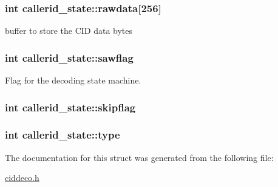 \subsubsection[{rawdata}]{\setlength{\rightskip}{0pt plus 5cm}int callerid\+\_\+state\+::rawdata\mbox{[}256\mbox{]}}\label{structcallerid__state_a6a073312c8b127292ccd43573f46af1f}


buffer to store the C\+I\+D data bytes 

\hypertarget{structcallerid__state_a62086559eee5b1f234fb1fc0e742d7c4}{}
\subsubsection[{sawflag}]{\setlength{\rightskip}{0pt plus 5cm}int callerid\+\_\+state\+::sawflag}\label{structcallerid__state_a62086559eee5b1f234fb1fc0e742d7c4}


Flag for the decoding state machine. 

\hypertarget{structcallerid__state_a84a4244e0f6780f44cb57ae15fa0dfe4}{}
\subsubsection[{skipflag}]{\setlength{\rightskip}{0pt plus 5cm}int callerid\+\_\+state\+::skipflag}\label{structcallerid__state_a84a4244e0f6780f44cb57ae15fa0dfe4}
\hypertarget{structcallerid__state_a40a4612d818438947b0d8857fa86ef8e}{}
\subsubsection[{type}]{\setlength{\rightskip}{0pt plus 5cm}int callerid\+\_\+state\+::type}\label{structcallerid__state_a40a4612d818438947b0d8857fa86ef8e}


The documentation for this struct was generated from the following file\+:\begin{DoxyCompactItemize}
\item 
\hyperlink{ciddeco_8h}{ciddeco.\+h}\end{DoxyCompactItemize}
